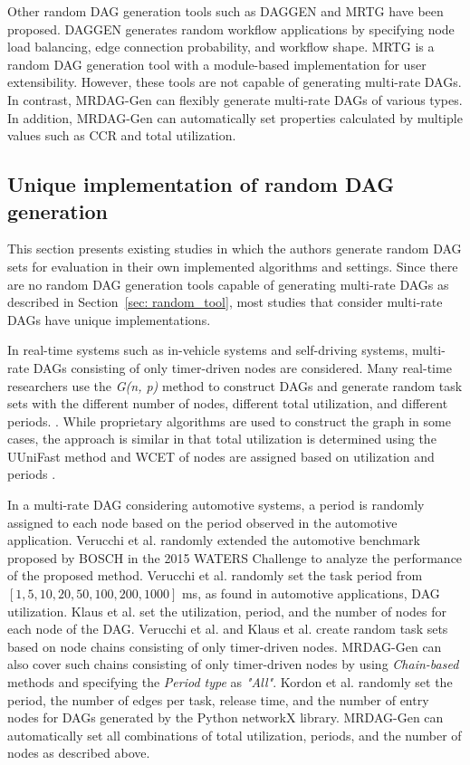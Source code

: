 Other random DAG generation tools such as DAGGEN \cite{amalarethinam2011dagen} and MRTG \cite{ashish2016modular} have been proposed.
DAGGEN generates random workflow applications by specifying node load balancing, edge connection probability, and workflow shape.
MRTG is a random DAG generation tool with a module-based implementation for user extensibility.
However, these tools are not capable of generating multi-rate DAGs.
In contrast, MRDAG-Gen can flexibly generate multi-rate DAGs of various types.
In addition, MRDAG-Gen can automatically set properties calculated by multiple values such as CCR and total utilization.


\subsection{Unique implementation of random DAG generation}

This section presents existing studies in which the authors generate random DAG sets for evaluation in their own implemented algorithms and settings.
Since there are no random DAG generation tools capable of generating multi-rate DAGs as described in Section~\ref{sec: random_tool}, most studies that consider multi-rate DAGs have unique implementations.

In real-time systems such as in-vehicle systems and self-driving systems, multi-rate DAGs consisting of only timer-driven nodes are considered.
Many real-time researchers use the {\it G(n, p)} method to construct DAGs and generate random task sets with the different number of nodes, different total utilization, and different periods. \cite{voronov2021ai, he2021response, dong2019efficient}.
While proprietary algorithms are used to construct the graph in some cases, the approach is similar in that total utilization is determined using the UUniFast method and WCET of nodes are assigned based on utilization and periods \cite{yang2020mixed, gunzel2021suspension, ueter2021hard}.

In a multi-rate DAG considering automotive systems, a period is randomly assigned to each node based on the period observed in the automotive application.
Verucchi et al. \cite{verucchi2020latency} randomly extended the automotive benchmark proposed by BOSCH in the 2015 WATERS Challenge \cite{kramer2015real} to analyze the performance of the proposed method.
Verucchi et al. randomly set the task period from $[1, 5, 10, 20, 50, 100, 200, 1000]$ ms, as found in automotive applications, DAG utilization.
Klaus et al. \cite{klaus2021constrained} set the utilization, period, and the number of nodes for each node of the DAG.
Verucchi et al. and Klaus et al. create random task sets based on node chains consisting of only timer-driven nodes.
MRDAG-Gen can also cover such chains consisting of only timer-driven nodes by using {\it Chain-based} methods and specifying the {\it Period type} as {\it "All"}.
Kordon et al. \cite{kordon2020evaluation} randomly set the period, the number of edges per task, release time, and the number of entry nodes for DAGs generated by the Python networkX library.
MRDAG-Gen can automatically set all combinations of total utilization, periods, and the number of nodes as described above.


